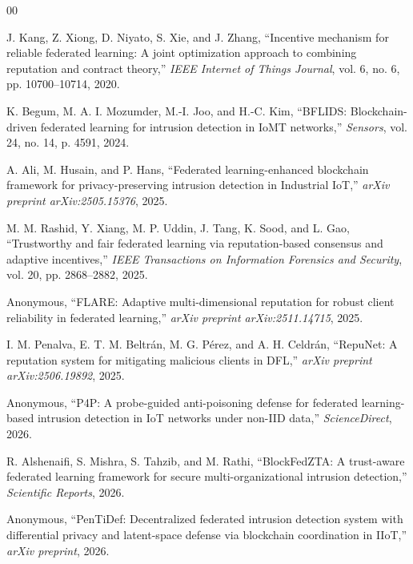 \documentclass[conference]{IEEEtran}
\begin{document}
\begin{thebibliography}{00}

J. Kang, Z. Xiong, D. Niyato, S. Xie, and J. Zhang, ``Incentive mechanism for reliable federated learning: A joint optimization approach to combining reputation and contract theory,'' \emph{IEEE Internet of Things Journal}, vol. 6, no. 6, pp. 10700--10714, 2020.

K. Begum, M. A. I. Mozumder, M.-I. Joo, and H.-C. Kim, ``BFLIDS: Blockchain-driven federated learning for intrusion detection in IoMT networks,'' \emph{Sensors}, vol. 24, no. 14, p. 4591, 2024.

A. Ali, M. Husain, and P. Hans, ``Federated learning-enhanced blockchain framework for privacy-preserving intrusion detection in Industrial IoT,'' \emph{arXiv preprint arXiv:2505.15376}, 2025.

M. M. Rashid, Y. Xiang, M. P. Uddin, J. Tang, K. Sood, and L. Gao, ``Trustworthy and fair federated learning via reputation-based consensus and adaptive incentives,'' \emph{IEEE Transactions on Information Forensics and Security}, vol. 20, pp. 2868--2882, 2025.

Anonymous, ``FLARE: Adaptive multi-dimensional reputation for robust client reliability in federated learning,'' \emph{arXiv preprint arXiv:2511.14715}, 2025.

I. M. Penalva, E. T. M. Beltr\'an, M. G. P\'erez, and A. H. Celdr\'an, ``RepuNet: A reputation system for mitigating malicious clients in DFL,'' \emph{arXiv preprint arXiv:2506.19892}, 2025.

Anonymous, ``P4P: A probe-guided anti-poisoning defense for federated learning-based intrusion detection in IoT networks under non-IID data,'' \emph{ScienceDirect}, 2026.

R. Alshenaifi, S. Mishra, S. Tahzib, and M. Rathi, ``BlockFedZTA: A trust-aware federated learning framework for secure multi-organizational intrusion detection,'' \emph{Scientific Reports}, 2026.

Anonymous, ``PenTiDef: Decentralized federated intrusion detection system with differential privacy and latent-space defense via blockchain coordination in IIoT,'' \emph{arXiv preprint}, 2026.

\end{thebibliography}
\end{document}
